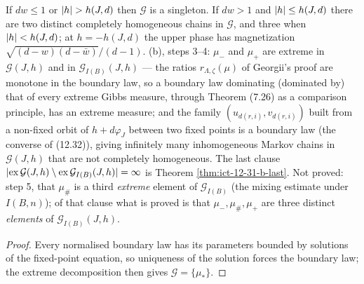 \begin{theorem}[Georgii (12.31), (12.33)]
    If $dw \leq 1$ or $\lvert h\rvert > h(J,d)$ then $\mathcal G$ is a singleton. If $dw > 1$ and
    $\lvert h\rvert \leq h(J,d)$ there are two distinct completely homogeneous chains in $\mathcal G$, and
    three when $\lvert h\rvert < h(J,d)$; at $h = -h(J,d)$ the upper phase has magnetization
    $\sqrt{(d-w)(d-\bar w)}/(d-1)$. (b), steps 3--4: $\mu_-$ and $\mu_+$ are extreme in
    $\mathcal G(J,h)$ and in $\mathcal G_{I(B)}(J,h)$ --- the ratios $r_{\Lambda,\zeta}(\mu)$ of
    Georgii's proof are monotone in the boundary law, so a boundary law dominating (dominated by)
    that of every extreme Gibbs measure, through Theorem (7.26) as a comparison principle, has an
    extreme measure; and the family $(u_{d(r,i)}, v_{d(r,i)})$ built from a non-fixed orbit of
    $h + d\varphi_J$ between two fixed points is a boundary law (the converse of (12.32)), giving
    infinitely many inhomogeneous Markov chains in $\mathcal G(J,h)$ that are not completely
    homogeneous. The last clause $\lvert \operatorname{ex}\mathcal G(J,h) \setminus
    \operatorname{ex}\mathcal G_{I(B)}(J,h)\rvert = \infty$ is Theorem \ref{thm:ict-12-31-b-last}.
    Not proved: step 5, that $\mu_\#$ is a third \emph{extreme} element of $\mathcal G_{I(B)}$
    (the mixing estimate under $I(B,n)$); of that clause what is proved is that
    $\mu_-, \mu_\#, \mu_+$ are three distinct \emph{elements} of $\mathcal G_{I(B)}(J,h)$.
\end{theorem}
\begin{proof}
    \leanok
    Every normalised boundary law has its parameters bounded by solutions of the fixed-point
    equation, so uniqueness of the solution forces the boundary law; the extreme decomposition then
    gives $\mathcal G = \{\mu_*\}$.
\end{proof}


